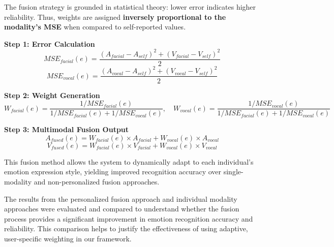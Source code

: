 \par The fusion strategy is grounded in statistical theory: lower error indicates higher reliability. Thus, weights are assigned \textbf{inversely proportional to the modality's MSE} when compared to self-reported values.

\textbf{Step 1: Error Calculation}
\[
MSE_{facial}(e) = \frac{(A_{facial} - A_{self})^2 + (V_{facial} - V_{self})^2}{2}
\]
\[
MSE_{vocal}(e) = \frac{(A_{vocal} - A_{self})^2 + (V_{vocal} - V_{self})^2}{2}
\]

\textbf{Step 2: Weight Generation}
\[
W_{facial}(e) = \frac{1/MSE_{facial}(e)}{1/MSE_{facial}(e) + 1/MSE_{vocal}(e)}, \quad
W_{vocal}(e) = \frac{1/MSE_{vocal}(e)}{1/MSE_{facial}(e) + 1/MSE_{vocal}(e)}
\]

\textbf{Step 3: Multimodal Fusion Output}
\[
A_{fused}(e) = W_{facial}(e) \times A_{facial} + W_{vocal}(e) \times A_{vocal}
\]
\[
V_{fused}(e) = W_{facial}(e) \times V_{facial} + W_{vocal}(e) \times V_{vocal}
\]

\par This fusion method allows the system to dynamically adapt to each individual's emotion expression style, yielding improved recognition accuracy over single-modality and non-personalized fusion approaches.

\par The results from the personalized fusion approach and individual modality approaches were evaluated and compared to understand whether the fusion process provides a significant improvement in emotion recognition accuracy and reliability. This comparison helps to justify the effectiveness of using adaptive, user-specific weighting in our framework.
